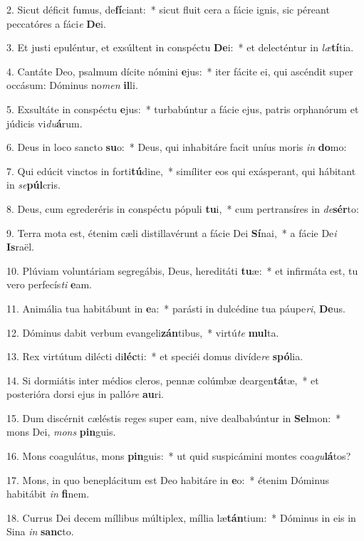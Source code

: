 2. Sicut déficit fumus, de\textbf{fí}ciant:~*  sicut fluit cera a fácie ignis, sic péreant peccatóres a fáci\textit{e} \textbf{De}i.\

3. Et justi epuléntur, et exsúltent in conspéctu \textbf{De}i:~*  et delecténtur in \textit{læ}\textbf{tí}tia.\

4. Cantáte Deo, psalmum dícite nómini \textbf{e}jus:~*  iter fácite ei, qui ascéndit super occásum: Dóminus no\textit{men} \textbf{il}li.\

5. Exsultáte in conspéctu \textbf{e}jus:~*  turbabúntur a fácie ejus, patris orphanórum et júdicis vi\textit{du}\textbf{á}rum.\

6. Deus in loco sancto \textbf{su}o:~*  Deus, qui inhabitáre facit uníus moris \textit{in} \textbf{do}mo:\

7. Qui edúcit vinctos in forti\textbf{tú}dine,~*  simíliter eos qui exásperant, qui hábitant in \textit{se}\textbf{púl}cris.\

8. Deus, cum egrederéris in conspéctu pópuli \textbf{tu}i,~*  cum pertransíres in \textit{de}\textbf{sér}to:\

9. Terra mota est, étenim cæli distillavérunt a fácie Dei \textbf{Sí}nai,~*  a fácie De\textit{i} \textbf{Is}raël.\

10. Plúviam voluntáriam segregábis, Deus, hereditáti \textbf{tu}æ:~*  et infirmáta est, tu vero perfecís\textit{ti} \textbf{e}am.\

11. Animália tua habitábunt in \textbf{e}a:~*  parásti in dulcédine tua páupe\textit{ri}, \textbf{De}us.\

12. Dóminus dabit verbum evangeli\textbf{zán}tibus,~*  virtú\textit{te} \textbf{mul}ta.\

13. Rex virtútum dilécti di\textbf{léc}ti:~*  et speciéi domus divíde\textit{re} \textbf{spó}lia.\

14. Si dormiátis inter médios cleros, pennæ colúmbæ deargen\textbf{tá}tæ,~*  et posterióra dorsi ejus in palló\textit{re} \textbf{au}ri.\

15. Dum discérnit cæléstis reges super eam, nive dealbabúntur in \textbf{Sel}mon:~*  mons Dei, \textit{mons} \textbf{pin}guis.\

16. Mons coagulátus, mons \textbf{pin}guis:~*  ut quid suspicámini montes coa\textit{gu}\textbf{lá}tos?\

17. Mons, in quo beneplácitum est Deo habitáre in \textbf{e}o:~*  étenim Dóminus habitábit \textit{in} \textbf{fi}nem.\

18. Currus Dei decem míllibus múltiplex, míllia læ\textbf{tán}tium:~*  Dóminus in eis in Sina \textit{in} \textbf{sanc}to.\

